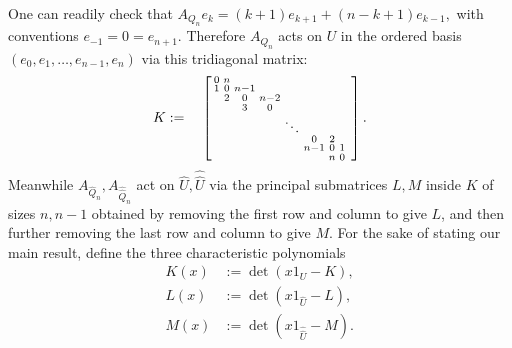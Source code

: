 \documentclass[10pt]{amsart}
\theoremstyle{plain}
\begin{document}
One can readily check that 
$
A_{Q_n}e_k=(k+1) e_{k+1}+(n-k+1)e_{k-1},
$
with conventions $e_{-1}=0=e_{n+1}$.  Therefore $A_{Q_n}$ acts on $U$ in the ordered basis 
$(e_0,e_1,\ldots,e_{n-1},e_n)$ 
via this tridiagonal matrix:
\begin{equation}
\label{eq:transposed-Kac-matrix}
K:=\quad
\left[\begin{smallmatrix}
 0 & n &    &       &       &  &    & \cr
 1 & 0 & n-1&       &       &   &   & \cr
  & 2 &  0 &n-2    &       &    &  & \cr
   &   & 3  &0      & &     & & \cr
    &   &    & &\ddots      &  & \cr
 &   &    & & &0  &2    &  & \cr
&   &    &   &    &n-1    &0     & 1\cr 
&    &    &   &    &       & n    & 0 
\end{smallmatrix}\right].
\end{equation}
Meanwhile $A_{\hat{Q}_n}, A_{\hat{\hat{Q}}_n} $ act on $\hat{U}, \hat{\hat{U}}$ via the principal submatrices $L, M$ inside $K$ 
of sizes $n, n-1$ obtained by removing the first row and column to give $L$, and
then further removing the last row and column to give $M$.  For the sake of stating our main result, define the three characteristic polynomials
\begin{align*}
    K(x)&:= \det(x 1_U - K), \\
    L(x)&:=\det(x 1_{\hat{U}} - L), \\
    M(x)&:=\det(x 1_{\hat{\hat{U}}} - M).
\end{align*}
\end{document}
